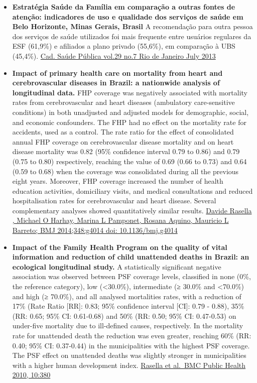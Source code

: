 \documentclass[]{book}
\begin{document}
\begin{itemize}
\item
  \textbf{Estratégia Saúde da Família em comparação a outras fontes de atenção: indicadores de uso e qualidade dos serviços de saúde em Belo Horizonte, Minas Gerais, Brasil} A recomendação para outra pessoa dos serviços de saúde utilizados foi mais frequente entre usuários regulares da ESF (61,9\%) e afiliados a plano privado (55,6\%), em comparação à UBS (45,4\%). \href{http://www.scielo.br/scielo.php?script=sci_arttext\&pid=S0102-311X2013000700011\&lng=en\&nrm=iso\&tlng=en}{Cad. Saúde Pública vol.29 no.7 Rio de Janeiro July 2013}
\item
  \textbf{Impact of primary health care on mortality from heart and cerebrovascular diseases in Brazil: a nationwide analysis of longitudinal data.} FHP coverage was negatively associated with mortality rates from cerebrovascular and heart diseases (ambulatory care-sensitive conditions) in both unadjusted and adjusted models for demographic, social, and economic confounders. The FHP had no effect on the mortality rate for accidents, used as a control. The rate ratio for the effect of consolidated annual FHP coverage on cerebrovascular disease mortality and on heart disease mortality was 0.82 (95\% confidence interval 0.79 to 0.86) and 0.79 (0.75 to 0.80) respectively, reaching the value of 0.69 (0.66 to 0.73) and 0.64 (0.59 to 0.68) when the coverage was consolidated during all the previous eight years. Moreover, FHP coverage increased the number of health education activities, domiciliary visits, and medical consultations and reduced hospitalisation rates for cerebrovascular and heart disease. Several complementary analyses showed quantitatively similar results. \href{https://www.bmj.com/content/bmj/349/bmj.g4014.full.pdf}{Davide Rasella , Michael O Harhay, Marina L Pamponet, Rosana Aquino, Mauricio L Barreto; BMJ 2014;348:g4014 doi: 10.1136/bmj.g4014}
\item
  \textbf{Impact of the Family Health Program on the quality of vital information and reduction of child unattended deaths in Brazil: an ecological longitudinal study.} A statistically significant negative association was observed between PSF coverage levels, classified in none (0\%, the reference category), low (\textless{}30.0\%), intermediate (≥ 30.0\% and \textless{}70.0\%) and high (≥ 70.0\%), and all analysed mortalities rates, with a reduction of 17\% (Rate Ratio {[}RR{]}: 0.83; 95\% confidence interval {[}CI{]}: 0.79 - 0.88), 35\% (RR: 0.65; 95\% CI: 0.61-0.68) and 50\% (RR: 0.50; 95\% CI: 0.47-0.53) on under-five mortality due to ill-defined causes, respectively. In the mortality rate for unattended death the reduction was even greater, reaching 60\% (RR: 0.40; 95\% CI: 0.37-0.44) in the municipalities with the highest PSF coverage. The PSF effect on unattended deaths was slightly stronger in municipalities with a higher human development index. \href{https://bmcpublichealth.biomedcentral.com/track/pdf/10.1186/1471-2458-10-380}{Rasella et al.~BMC Public Health 2010, 10:380}

\end{itemize}
\end{document}
